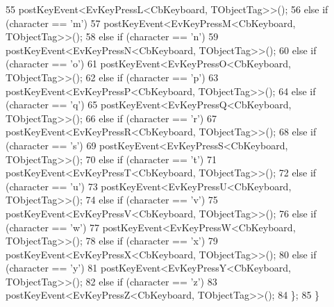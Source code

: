 \begin{DoxyCode}
55                                 postKeyEvent<EvKeyPressL<CbKeyboard, TObjectTag>>();
56                         \textcolor{keywordflow}{else} \textcolor{keywordflow}{if} (character == \textcolor{charliteral}{'m'})
57                                 postKeyEvent<EvKeyPressM<CbKeyboard, TObjectTag>>();
58                         \textcolor{keywordflow}{else} \textcolor{keywordflow}{if} (character == \textcolor{charliteral}{'n'})
59                                 postKeyEvent<EvKeyPressN<CbKeyboard, TObjectTag>>();
60                         \textcolor{keywordflow}{else} \textcolor{keywordflow}{if} (character == \textcolor{charliteral}{'o'})
61                                 postKeyEvent<EvKeyPressO<CbKeyboard, TObjectTag>>();
62                         \textcolor{keywordflow}{else} \textcolor{keywordflow}{if} (character == \textcolor{charliteral}{'p'})
63                                 postKeyEvent<EvKeyPressP<CbKeyboard, TObjectTag>>();
64                         \textcolor{keywordflow}{else} \textcolor{keywordflow}{if} (character == \textcolor{charliteral}{'q'})
65                                 postKeyEvent<EvKeyPressQ<CbKeyboard, TObjectTag>>();
66                         \textcolor{keywordflow}{else} \textcolor{keywordflow}{if} (character == \textcolor{charliteral}{'r'})
67                                 postKeyEvent<EvKeyPressR<CbKeyboard, TObjectTag>>();
68                         \textcolor{keywordflow}{else} \textcolor{keywordflow}{if} (character == \textcolor{charliteral}{'s'})
69                                 postKeyEvent<EvKeyPressS<CbKeyboard, TObjectTag>>();
70                         \textcolor{keywordflow}{else} \textcolor{keywordflow}{if} (character == \textcolor{charliteral}{'t'})
71                                 postKeyEvent<EvKeyPressT<CbKeyboard, TObjectTag>>();
72                         \textcolor{keywordflow}{else} \textcolor{keywordflow}{if} (character == \textcolor{charliteral}{'u'})
73                                 postKeyEvent<EvKeyPressU<CbKeyboard, TObjectTag>>();
74                         \textcolor{keywordflow}{else} \textcolor{keywordflow}{if} (character == \textcolor{charliteral}{'v'})
75                                 postKeyEvent<EvKeyPressV<CbKeyboard, TObjectTag>>();
76                         \textcolor{keywordflow}{else} \textcolor{keywordflow}{if} (character == \textcolor{charliteral}{'w'})
77                                 postKeyEvent<EvKeyPressW<CbKeyboard, TObjectTag>>();
78                         \textcolor{keywordflow}{else} \textcolor{keywordflow}{if} (character == \textcolor{charliteral}{'x'})
79                                 postKeyEvent<EvKeyPressX<CbKeyboard, TObjectTag>>();
80                         \textcolor{keywordflow}{else} \textcolor{keywordflow}{if} (character == \textcolor{charliteral}{'y'})
81                                 postKeyEvent<EvKeyPressY<CbKeyboard, TObjectTag>>();
82                         \textcolor{keywordflow}{else} \textcolor{keywordflow}{if} (character == \textcolor{charliteral}{'z'})
83                                 postKeyEvent<EvKeyPressZ<CbKeyboard, TObjectTag>>();
84                 \};
85         \}
\end{DoxyCode}
